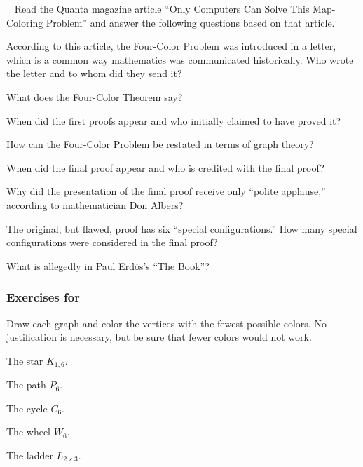 \begin{exer}[\exerE] %
~    Read the Quanta magazine article ``Only Computers Can Solve This Map-Coloring Problem'' and answer the following questions based on that article.
    \begin{exerpart}
        \item According to this article, the Four-Color Problem was introduced in a letter, which is a common way mathematics was communicated historically.  Who wrote the letter and to whom did they send it?
        \item What does the Four-Color Theorem say?
        \item When did the first proofs appear and who initially claimed to have proved it?
        \item How can the Four-Color Problem be restated in terms of graph theory?
        \item When did the final proof appear and who is credited with the final proof?
        \item Why did the presentation of the final proof receive only ``polite applause,'' according to mathematician Don Albers?
        \item The original, but flawed, proof has six ``special configurations.''  How many special configurations were considered in the final proof?
        \item What is allegedly in Paul Erd\"os's ``The Book''? 
    \end{exerpart} 
\end{exer}


\subsubsection*{Exercises for  \subchromatic}

\begin{exer}[\exerP] %
\label{exer_coloring_standard_graphs}
Draw each graph and color the vertices with the fewest possible colors.  No justification is necessary, but be sure that fewer colors would not work.    
        \begin{exerpart}
            \item The star $K_{1,6}$.           
            \item The path $P_6$.
            \item The cycle $C_6$.
            \item The wheel $W_6$.
            \item The ladder $L_{2\times3}$.
        \end{exerpart}
\end{exer}

